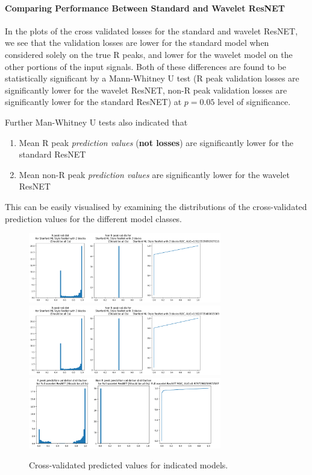 \documentclass[9pt,conference]{IEEEtran}
\begin{document}
\paragraph{\textbf{Comparing Performance Between Standard and Wavelet ResNET}}
In the plots of the cross validated losses for the standard and wavelet ResNET, we see that the validation losses are lower for the standard model when considered solely on the true R peaks, and lower for the wavelet model on the other portions of the input signals. Both of these differences are found to be statistically significant by a Mann-Whitney U test (R peak validation losses are significantly lower for the wavelet ResNET, non-R peak validation losses are significantly lower for the standard ResNET) at $p=0.05$ level of significance.

Further Man-Whitney U tests also indicated that 

\begin{enumerate}
    \item Mean R peak \textit{prediction values} (\textbf{not losses}) are significantly lower for the standard ResNET
    \item Mean non-R peak \textit{prediction values} are significantly lower for the wavelet ResNET
\end{enumerate} 

This can be easily visualised by examining the distributions of the cross-validated prediction values for the different model classes.

\begin{figure}[H]
    \centering
    \includegraphics[width=0.75\textwidth]{resnet2Dist.png}
    \includegraphics[width=0.75\textwidth]{resnet3Dist.png}
    \includegraphics[width=0.75\textwidth]{waveletNetDist.png}
    \caption{Cross-validated predicted values for indicated models.}
\end{figure}
\end{document}
